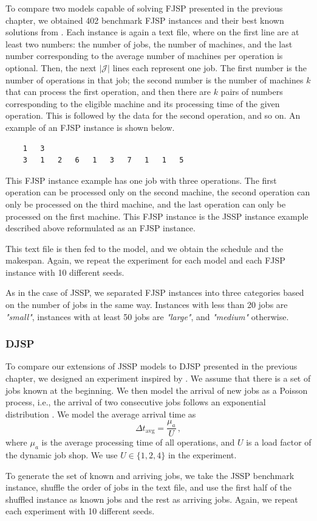 To compare two models capable of solving FJSP presented in the previous chapter, we obtained 402 benchmark FJSP instances and their best known solutions from \cite{fjsp_benchmarks}. Each instance is again a text file, where on the first line are at least two numbers: the number of jobs, the number of machines, and the last number corresponding to the average number of machines per operation is optional. Then, the next $|\mathcal{J}|$ lines each represent one job. The first number is the number of operations in that job; the second number is the number of machines $k$ that can process the first operation, and then there are $k$ pairs of numbers corresponding to the eligible machine and its processing time of the given operation. This is followed by the data for the second operation, and so on. An example of an FJSP instance is shown below.
\begin{verbatim}
    1   3
    3   1   2   6   1   3   7   1   1   5   
\end{verbatim}
This FJSP instance example has one job with three operations. The first operation can be processed only on the second machine, the second operation can only be processed on the third machine, and the last operation can only be processed on the first machine. This FJSP instance is the JSSP instance example described above reformulated as an FJSP instance.
\par 
This text file is then fed to the model, and we obtain the schedule and the makespan. Again, we repeat the experiment for each model and each FJSP instance with 10 different seeds.
\par
As in the case of JSSP, we separated FJSP instances into three categories based on the number of jobs in the same way. Instances with less than 20 jobs are \textit{"small"}, instances with at least 50 jobs are \textit{"large"}, and \textit{"medium"} otherwise.

\subsubsection*{DJSP}
To compare our extensions of JSSP models to DJSP presented in the previous chapter, we designed an experiment inspired by \cite{djsp_experiment_design}. We assume that there is a set of jobs known at the beginning. We then model the arrival of new jobs as a Poisson process, i.e., the arrival of two consecutive jobs follows an exponential distribution \cite{djsp_experiment_design}. We model the average arrival time as 
\begin{equation}
    \Delta t_\text{avg} = \frac{\mu_a}{U} \, ,
\end{equation}
where $\mu_a$ is the average processing time of all operations, and $U$ is a load factor of the dynamic job shop. We use $U \in \{1,2,4 \}$ in the experiment. 
\par
To generate the set of known and arriving jobs, we take the JSSP benchmark instance, shuffle the order of jobs in the text file, and use the first half of the shuffled instance as known jobs and the rest as arriving jobs. Again, we repeat each experiment with 10 different seeds.

